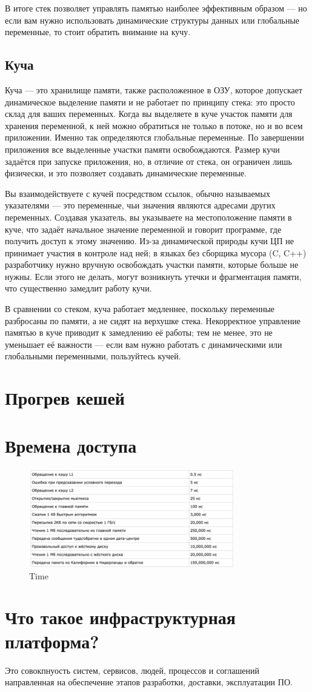 В итоге стек позволяет управлять памятью наиболее эффективным образом — но если вам нужно использовать динамические структуры данных или глобальные переменные, то стоит обратить внимание на кучу.

\subsection{Куча}

Куча — это хранилище памяти, также расположенное в ОЗУ, которое допускает динамическое выделение памяти и не работает по принципу стека: это просто склад для ваших переменных. Когда вы выделяете в куче участок памяти для хранения переменной, к ней можно обратиться не только в потоке, но и во всем приложении. Именно так определяются глобальные переменные. По завершении приложения все выделенные участки памяти освобождаются. Размер кучи задаётся при запуске приложения, но, в отличие от стека, он ограничен лишь физически, и это позволяет создавать динамические переменные.

Вы взаимодействуете с кучей посредством ссылок, обычно называемых указателями — это переменные, чьи значения являются адресами других переменных. Создавая указатель, вы указываете на местоположение памяти в куче, что задаёт начальное значение переменной и говорит программе, где получить доступ к этому значению. Из-за динамической природы кучи ЦП не принимает участия в контроле над ней; в языках без сборщика мусора (C, C++) разработчику нужно вручную освобождать участки памяти, которые больше не нужны. Если этого не делать, могут возникнуть утечки и фрагментация памяти, что существенно замедлит работу кучи.

В сравнении со стеком, куча работает медленнее, поскольку переменные разбросаны по памяти, а не сидят на верхушке стека. Некорректное управление памятью в куче приводит к замедлению её работы; тем не менее, это не уменьшает её важности — если вам нужно работать с динамическими или глобальными переменными, пользуйтесь кучей.

\section{Прогрев кешей}

\section{Времена доступа}

\begin{figure}[h!]
\centering
\includegraphics[width=0.8\textwidth]{img/time.png}
\caption{Time}
\label{time}
\end{figure}

\section{Что такое инфраструктурная платформа?}
Это совокпнуость систем, сервисов, людей, процессов и соглашений направленная на обеспечение этапов разработки, доставки, эксплуатации ПО. 
